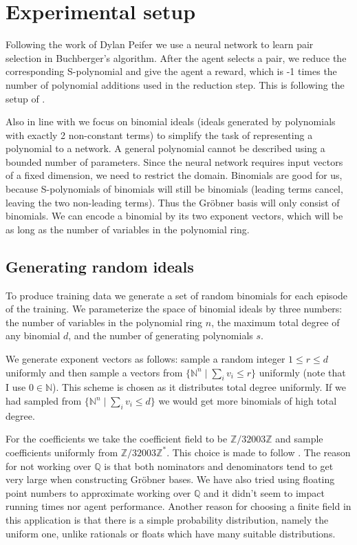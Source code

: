 \documentclass{article}
\theoremstyle{changedot}
\theoremstyle{changedotbreak}
\theoremstyle{nonumberplain}
\newcommand{\m}{\mathbb}
\begin{document}
\section{Experimental setup}
Following the work of Dylan Peifer \cite{peifer} we use a neural network to learn pair selection in Buchberger's algorithm. After the agent selects a pair, we reduce the corresponding S-polynomial and give the agent a reward, which is -1 times the number of polynomial additions used in the reduction step. This is following the setup of \cite{peifer}.

Also in line with \cite{peifer} we focus on binomial ideals (ideals generated by polynomials with exactly 2 non-constant terms) to simplify the task of representing a polynomial to a network. A general polynomial cannot be described using a bounded number of parameters. Since the neural network requires input vectors of a fixed dimension, we need to restrict the domain. Binomials are good for us, because S-polynomials of binomials will still be binomials (leading terms cancel, leaving the two non-leading terms). Thus the Gröbner basis will only consist of binomials. We can encode a binomial by its two exponent vectors, which will be as long as the number of variables in the polynomial ring.


\subsection{Generating random ideals}
To produce training data we generate a set of random binomials for each episode of the training. We parameterize the space of binomial ideals by three numbers: the number of variables in the polynomial ring $n$, the maximum total degree of any binomial $d$, and the number of generating polynomials $s$.

We generate exponent vectors as follows: sample a random integer $1 \leq r \leq d$ uniformly and then sample a vectors from $\{\m N^{n} \mid \sum_{i} v_{i} \leq r\}$ uniformly (note that I use $0 \in \m N$). This scheme is chosen as it distributes total degree uniformly. If we had sampled from $\{\m N^{n} \mid \sum_{i} v_{i} \leq d\}$ we would get more binomials of high total degree.

For the coefficients we take the coefficient field to be $\m Z / 32003 \m Z$ and sample coefficients uniformly from $\m Z / 32003\m Z ^{*}$. This choice is made to follow \cite{peifer}. The reason for not working over $\m Q$ is that both nominators and denominators tend to get very large when constructing Gröbner bases. We have also tried using floating point numbers to approximate working over $\m Q$ and it didn't seem to impact running times nor agent performance. Another reason for choosing a finite field in this application is that there is a simple probability distribution, namely the uniform one, unlike rationals or floats which have many suitable distributions.
\end{document}
